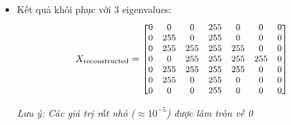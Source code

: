 \begin{itemize}
\begin{itemize}
                    Sau khi áp dụng threshold $\geq$ 150:
                    \begin{align*}
                        X_{\text{binary}} = \begin{bmatrix}
                        0 & 0 & 0 & 255 & 0 & 0 & 0 \\
                        0 & 0 & 0 & 255 & 0 & 0 & 0 \\
                        0 & 255 & 255 & 255 & 255 & 0 & 0 \\
                        0 & 255 & 255 & 255 & 255 & 0 & 0 \\
                        0 & 255 & 255 & 255 & 255 & 0 & 0 \\
                        0 & 0 & 0 & 255 & 0 & 0 & 0 \\
                        0 & 0 & 0 & 255 & 0 & 0 & 0
                        \end{bmatrix}
                    \end{align*}
                    
                \item Kết quả khôi phục với 3 eigenvalues:
                    \begin{align*}
                        \small
                        X_{\text{reconstructed}} = \begin{bmatrix}
                        0 & 0 & 0 & 255 & 0 & 0 & 0 \\
                        0 & 255 & 0 & 255 & 0 & 0 & 0 \\
                        0 & 255 & 255 & 255 & 255 & 0 & 0 \\
                        0 & 0 & 255 & 255 & 255 & 255 & 0 \\
                        0 & 255 & 255 & 255 & 255 & 0 & 0 \\
                        0 & 255 & 0 & 255 & 0 & 0 & 0 \\
                        0 & 0 & 0 & 255 & 0 & 0 & 0
                        \end{bmatrix}
                    \end{align*}
                    
                    \textit{Lưu ý: Các giá trị rất nhỏ ($\approx 10^{-5}$) được làm tròn về 0}
                    

\end{itemize}
\end{itemize}
